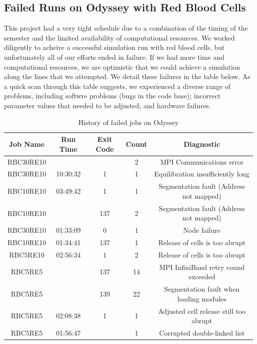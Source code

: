 \documentclass[11pt]{article} %
\begin{document}
\subsection{Failed Runs on Odyssey with Red Blood Cells}
This project had a very tight schedule due to a combination of the timing of the semester and the 
limited availability of computational resources.  
We worked diligently to acheive a successful simulation run with red blood cells, 
but unfortunately all of our efforts ended in failure.  
If we had more time and computational resources, we are optimistic that we could 
achieve a simulation along the lines that we attempted.
We detail these failures in the table below.
As a quick scan through this table suggests, we experienced a diverse range of
problems, including softwre problems (bugs in the code base); 
incorrect parameter values that needed to be adjusted; and hardware failures.
\begin{table}[h!]
\begin{center}
\label{tab:table1}
\begin{tabular}{|c|c|c|c|c|} %
\hline
\textbf{Job Name} & \textbf{Run Time} & \textbf{Exit Code } & \textbf{Count} & \textbf{Diagnostic}\\
\hline
RBC30RE10 &   &   & 2 & MPI Communications error \\
RBC30RE10 & 10:30:32  & 1 & 1 & Equilibration insufficiently long \\
RBC10RE10 & 03:49:42  & 1 & 1 & Segmentation fault (Address not mapped) \\
RBC10RE10 &    & 137 & 2 & Segmentation fault (Address not mapped) \\
RBC30RE10 & 01:33:09  & 0 & 1 & Node failure \\
RBC10RE10 & 01:34:41  & 137 & 1 & Release of cells is too abrupt \\
RBC5RE10 & 02:56:34  & 1 & 2 & Release of cells is too abrupt \\
RBC5RE5 &    & 137 & 14 & MPI InfiniBand retry cound exceeded \\
RBC5RE5 &    & 139 & 22 & Segmentation fault when loading modules \\
RBC5RE5 & 02:08:38  & 1 & 1 & Adjusted cell release still too abrupt \\
RBC5RE5 & 01:56:47  &   & 1 & Corrupted double-linked list \\
\hline
\end{tabular}
\end{center}
\caption*{History of failed jobs on Odyssey}
\end{table}
\end{document}
